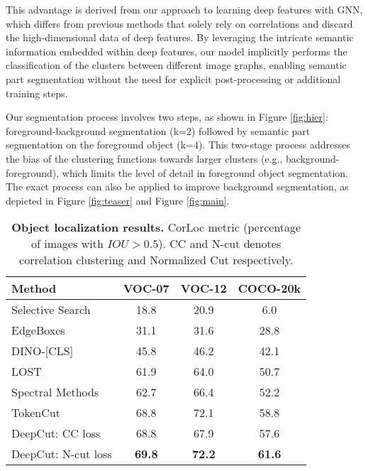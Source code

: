 \documentclass[10pt,twocolumn,letterpaper]{article}
\begin{document}
This advantage is derived from our approach to learning deep features with GNN, which differs from previous methods \cite{bianchi2020spectral, wang2022self} that solely rely on correlations and discard the high-dimensional data of deep features. By leveraging the intricate semantic information embedded within deep features, our model implicitly performs the classification of the clusters between different image graphs, enabling semantic part segmentation without the need for explicit post-processing or additional training steps.

Our segmentation process involves two steps, as shown in Figure \ref{fig:hier}: foreground-background segmentation (k=2) followed by semantic part segmentation on the foreground object (k=4). This two-stage process addresses the bias of the clustering functions towards larger clusters (e.g., background-foreground), which limits the level of detail in foreground object segmentation. The exact process can also be applied to improve background segmentation, as depicted in Figure \ref{fig:teaser} and Figure \ref{fig:main}.



\begin{table}
  \centering
  \begin{tabular}{@{}lc c c@{}}
    \toprule
    Method & VOC-07 & VOC-12 &COCO-20k\\
    \midrule
    Selective Search\cite{uijlings2013selective} & 18.8 & 20.9 & 6.0 \\
    EdgeBoxes\cite{zitnick2014edge} & 31.1 & 31.6 & 28.8 \\
    DINO-[CLS]\cite{caron2021emerging} & 45.8 & 46.2 & 42.1 \\
    LOST\cite{simeoni2021localizing} & 61.9 & 64.0 &  50.7\\
    Spectral Methods\cite{melas2022deep} & 62.7 & 66.4 &  52.2\\
    TokenCut\cite{wang2022self} & 68.8 & 72.1 &  58.8\\
    \midrule
    DeepCut:  CC loss&68.8 & 67.9 & 57.6\\
    DeepCut:  N-cut loss&\textbf{69.8} & \textbf{72.2} & \textbf{61.6}\\
    \bottomrule
  \end{tabular}
  \caption{\textbf{Object localization results.} CorLoc metric (percentage of images with $IOU > 0.5$). 
  CC and N-cut denotes correlation clustering and Normalized Cut respectively.}
  \label{tab:obdet}
\end{table}
 
\end{document}
